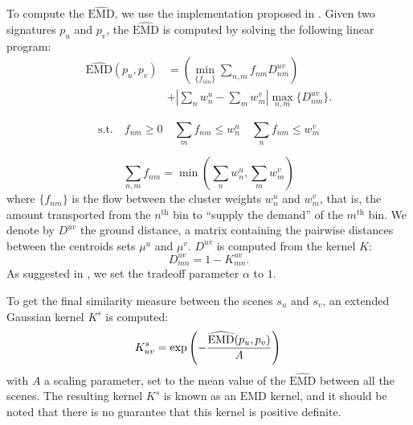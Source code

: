 \documentclass[journal]{IEEEtran}
\newcommand*{\EMD}{\mathrm{EMD}}
\newcommand{\ja}[1]{\textcolor{magenta}{Joakim : #1}}
\begin{document}
To compute the $\widehat{\EMD}$, we use the implementation proposed in \cite{pele2009fast}. Given two signatures $p_u$ and $p_v$, the $\widehat{\EMD}$ is computed by solving the following linear program:
\begin{equation}
\begin{split}
\widehat{\EMD}(p_u,p_v) &=\left( \min\limits_{\lbrace f_{nm}\rbrace} \sum\limits_{n,m} f_{nm}D_{nm}^{uv} \right) \\
&+ \left|\sum\limits_{n} w_n^u - \sum\limits_{m} w_m^v  \right| \max\limits_{n,m}\lbrace  D_{nm}^{uv}\rbrace.
\end{split}
\end{equation}

\begin{equation*}
\mathrm{s.t.} \quad f_{nm}\geq0 \quad \sum\limits_{m} f_{nm} \leq w_n^u \quad \sum\limits_{n} f_{nm} \leq w_m^v
\end{equation*}

\begin{equation*}
\sum\limits_{n,m}f_{nm} = \min\left( \sum\limits_{n} w_n^u ,\sum\limits_{m} w_m^v \right)
\end{equation*} 
where $\lbrace f_{nm} \rbrace$ is the flow between the cluster weights $w_n^u$ and $w_m^v$, that is, the amount transported from the $n^{\textrm{th}}$ bin to ``supply the demand'' of the $m^\textrm{th}$ bin. We denote by $D^{uv}$ the ground distance, a matrix containing the pairwise distances between the centroids sets $\mu^u$ and $\mu^v$. $D^{uv}$ is computed from the kernel $K$:
\begin{equation*}
D_{mn}^{uv}=1-K_{mn}^{uv}.
\end{equation*}
As suggested in \cite{pele2009fast}, we set the tradeoff parameter $\alpha$ to $1$.

To get the final similarity measure between the scenes $s_u$ and $s_v$, an extended Gaussian kernel $K^s$ is computed: %
\begin{equation}
\label{eq:ks}
K_{uv}^s = \exp\left( - \dfrac{\widehat{\EMD}(p_u,p_v)}{A} \right) \\
\end{equation}
with $A$ a scaling parameter, set to the mean value of the $\widehat{\EMD}$ between all the scenes. The resulting kernel $K^s$ is known as an $\EMD$ kernel, and it should be noted that there is no guarantee that this kernel is positive definite.
\end{document}
